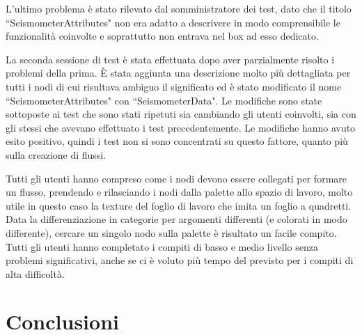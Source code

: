 \documentclass[a4paper,10pt]{memoir}
\begin{document}
L'ultimo problema è stato rilevato dal somministratore dei test, dato che il titolo ``SeismometerAttributes" non era adatto a descrivere in modo comprensibile le funzionalità coinvolte e soprattutto non entrava nel box ad esso dedicato.

La seconda sessione di test è stata effettuata dopo aver parzialmente risolto i problemi della prima. È stata aggiunta una descrizione molto più dettagliata per tutti i nodi di cui risultava ambiguo il significato ed è stato modificato il nome ``SeismometerAttributes" con ``SeismometerData". Le modifiche sono state sottoposte ai test che sono stati ripetuti sia cambiando gli utenti coinvolti, sia con gli stessi che avevano effettuato i test precedentemente. Le modifiche hanno avuto esito positivo, quindi i test non si sono concentrati su questo fattore, quanto più sulla creazione di flussi.

Tutti gli utenti hanno compreso come i nodi devono essere collegati per formare un flusso, prendendo e rilasciando i nodi dalla palette allo spazio di lavoro, molto utile in questo caso la texture del foglio di lavoro che imita un foglio a quadretti. Data la differenziazione in categorie per argomenti differenti (e colorati in modo differente), cercare un singolo nodo sulla palette è risultato un facile compito. Tutti gli utenti hanno completato i compiti di basso e medio livello senza problemi significativi, anche se ci è voluto più tempo del previsto per i compiti di alta difficoltà.

\section{Conclusioni}
\end{document}
